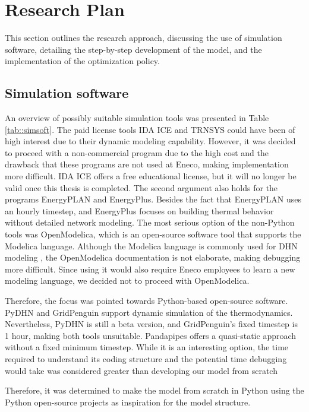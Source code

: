 \section{Research Plan}
This section outlines the research approach, discussing the use of simulation software, detailing the step-by-step development of the model, and the implementation of the optimization policy.

\subsection{Simulation software}\label{sec::SimulationModel}
An overview of possibly suitable simulation tools was presented in Table \ref{tab::simsoft}. The paid license tools IDA ICE and TRNSYS could have been of high interest due to their dynamic modeling capability. However, it was decided to proceed with a non-commercial program due to the high cost and the drawback that these programs are not used at Eneco, making implementation more difficult. IDA ICE offers a free educational license, but it will no longer be valid once this thesis is completed. The second argument also holds for the programs EnergyPLAN and EnergyPlus. Besides the fact that EnergyPLAN uses an hourly timestep, and EnergyPlus focuses on building thermal behavior without detailed network modeling. The most serious option of the non-Python tools was OpenModelica, which is an open-source software tool that supports the Modelica language. Although the Modelica language is commonly used for DHN modeling \cite{KUNTUAROVA}, the OpenModelica documentation is not elaborate, making debugging more difficult. Since using it would also require Eneco employees to learn a new modeling language, we decided not to proceed with OpenModelica.

Therefore, the focus was pointed towards Python-based open-source software. PyDHN and GridPenguin support dynamic simulation of the thermodynamics. Nevertheless, PyDHN is still a beta version, and GridPenguin's fixed timestep is 1 hour, making both tools unsuitable. Pandapipes offers a quasi-static approach without a fixed minimum timestep. While it is an interesting option, the time required to understand its coding structure and the potential time debugging would take was considered greater than developing our model from scratch

Therefore, it was determined to make the model from scratch in Python using the Python open-source projects as inspiration for the model structure.

